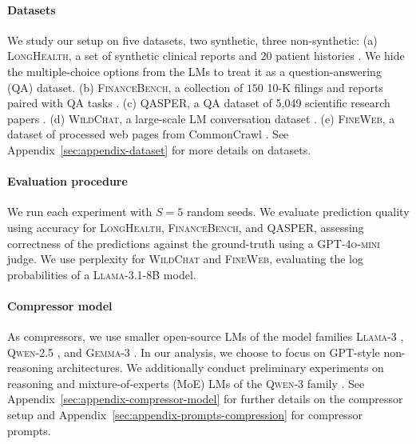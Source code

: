 \documentclass{article} %
\begin{document}
\paragraph*{Datasets} 
We study our setup on five datasets, two synthetic, three non-synthetic: (a) \textsc{LongHealth}, a set of synthetic clinical reports and $20$ patient histories \citep{adams2024longhealth}. We hide the multiple-choice options from the LMs to treat it as a question-answering (QA) dataset. (b) \textsc{FinanceBench}, a collection of $150$ 10-K filings and reports paired with QA tasks \citep{islam2023financebench}. (c) \textsc{QASPER}, a QA dataset of 5{,}049 scientific research papers \citep{qasper}. (d) \textsc{WildChat}, a large-scale LM conversation dataset \citep{zhao2024wildchat}. (e) \textsc{FineWeb}, a dataset of processed web pages from CommonCrawl \citep{penedo2024the}. See Appendix~\ref{sec:appendix-dataset} for more details on datasets.

\paragraph*{Evaluation procedure} We run each experiment with $S=5$ random seeds. We evaluate prediction quality using accuracy for \textsc{LongHealth}, \textsc{FinanceBench}, and \textsc{QASPER}, assessing correctness of the predictions against the ground-truth using a \textsc{GPT-4o-mini} judge. We use perplexity for \textsc{WildChat} and \textsc{FineWeb}, evaluating the log probabilities of a \textsc{Llama-3.1-8B} model.

\paragraph*{Compressor model} 
As compressors, we use smaller open-source LMs of the model families \textsc{Llama-3} \citep{grattafiori2024llama3herdmodels}, \textsc{Qwen-2.5} \citep{qwen2025qwen25technicalreport}, and \textsc{Gemma-3} \citep{team2025gemma}. In our analysis, we choose to focus on \textsc{GPT}-style non-reasoning architectures. We additionally conduct preliminary experiments on reasoning and mixture-of-experts (MoE) LMs of the \textsc{Qwen-3} family \citep{yang2025qwen3}. 
See Appendix~\ref{sec:appendix-compressor-model} for further details on the compressor setup and Appendix~\ref{sec:appendix-prompts-compression} for compressor prompts.
\end{document}

